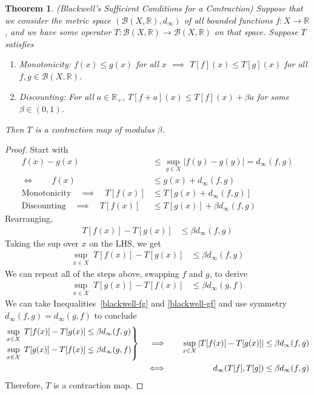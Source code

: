 \documentclass[12pt]{book}
\numberwithin{equation}{section} %
\theoremstyle{plain}
\newtheorem{thm}{Theorem}[section]
\theoremstyle{definition}
\theoremstyle{remark}
\newcommand{\ra}{\rightarrow}
\newcommand{\sB}{\mathscr{B}}
\newcommand{\R}{\mathbb{R}}
\newenvironment{rcases}
  {\left.\begin{aligned}}
  {\end{aligned}\right\rbrace}
\begin{document}
\begin{thm}{\emph{(Blackwell's Sufficient Conditions for a Contraction)}}
Suppose that we consider the metric space $(\sB(X,\R),d_\infty)$
of all bounded functions $f:X\ra\R$, and we
have some operator
$T:\mathscr{B}(X,\R)\rightarrow\mathscr{B}(X,\R)$ on that space.
Suppose $T$ satisfies
\begin{enumerate}
  \item \emph{Monotonicity}: $f(x) \leq g(x)$ for all $x$
    $\implies$ $T[f](x) \leq T[g](x)$ for all $f,g\in \sB(X,\R)$.
  \item \emph{Discounting}: For all $a\in\R_+$,
    $T[f+a](x) \leq T[f](x) + \beta a$ for some $\beta\in(0,1)$.
\end{enumerate}
Then $T$ is a contraction map of modulus $\beta$.
\end{thm}
\begin{proof}
Start with
\begin{align*}
  f(x)-g(x) &\leq \sup_{y\in X} |f(y)-g(y)| = d_\infty(f,g) \\
  \iff\qquad
  f(x) &\leq g(x) + d_\infty(f,g) \\
  \text{Monotonicity} \quad
  \implies\quad
  T[f(x)] &\leq T[g(x) + d_\infty(f,g)]
  \\
  \text{Discounting} \quad
  \implies\quad
  T[f(x)] &\leq T[g(x)] + \beta d_\infty(f,g)
\end{align*}
Rearranging,
\begin{align*}
  T[f(x)] - T[g(x)] &\leq \beta d_\infty(f,g)
\end{align*}
Taking the sup over $x$ on the LHS, we get
\begin{align}
  \sup_{x\in X} \; T[f(x)] - T[g(x)] &\leq \beta d_\infty(f,g)
  \label{blackwell-fg}
\end{align}
We can repeat all of the steps above, swapping $f$ and $g$, to derive
\begin{align}
  \sup_{x\in X} \; T[g(x)] - T[f(x)] &\leq \beta d_\infty(g,f)
  \label{blackwell-gf}
\end{align}
We can take Inequalities~\ref{blackwell-fg} and \ref{blackwell-gf} and
use symmetry $d_\infty(f,g)=d_\infty(g,f)$ to conclude
\begin{alignat*}{3}
  \begin{rcases}
  \sup_{x\in X} \; T[f(x)] - T[g(x)] &\leq \beta d_\infty(f,g)
  \\
  \sup_{x\in X} \; T[g(x)] - T[f(x)] &\leq \beta d_\infty(g,f)
  \end{rcases}
  \quad\implies&&\quad
  \sup_{x\in X} \left\lvert T[f(x)] - T[g(x)]\right\rvert
    &\leq \beta d_\infty(f,g) \\
  \iff&&\qquad
  d_\infty(T[f],T[g])
  &\leq \beta d_\infty(f,g)
\end{alignat*}
Therefore, $T$ is a contraction map.
\end{proof}
\end{document}
